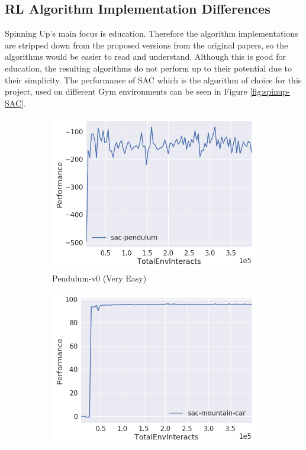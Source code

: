 \documentclass[12pt,twoside]{report}
\begin{document}
\subsection{RL Algorithm Implementation Differences} \label{RLF:imp-diff}
Spinning Up's main focus is education. Therefore the algorithm implementations are stripped down from the proposed versions from the original papers, so the algorithms would be easier to read and understand. Although this is good for education, the resulting algorithms do not perform up to their potential due to their simplicity. The performance of SAC which is the algorithm of choice for this project, used on different Gym environments can be seen in Figure \ref{fig:spinup-SAC}.

\begin{figure}[h]
     \centering
     \begin{subfigure}[t]{0.32\textwidth}
         \centering
         \includegraphics[width=\textwidth]{figures/rl-framework/sac-pendulum.png}
         \caption{Pendulum-v0 (Very Easy)}
     \end{subfigure}
     \hfill
     \begin{subfigure}[t]{0.32\textwidth}
         \centering
         \includegraphics[width=\textwidth]{figures/rl-framework/sac-mountain-car.png}

\end{subfigure}
\end{figure}
\end{document}
